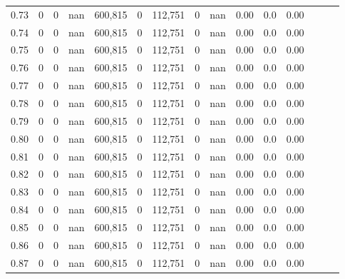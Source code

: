 \begin{tabular}{rrrrrrrrrrrrrrr}
0.73 &        0 &        0 &   nan &  600,815 &        0 &  112,751 &        0 &   nan &  0.00 &                   0.0 &      0.00 \\
0.74 &        0 &        0 &   nan &  600,815 &        0 &  112,751 &        0 &   nan &  0.00 &                   0.0 &      0.00 \\
0.75 &        0 &        0 &   nan &  600,815 &        0 &  112,751 &        0 &   nan &  0.00 &                   0.0 &      0.00 \\
0.76 &        0 &        0 &   nan &  600,815 &        0 &  112,751 &        0 &   nan &  0.00 &                   0.0 &      0.00 \\
0.77 &        0 &        0 &   nan &  600,815 &        0 &  112,751 &        0 &   nan &  0.00 &                   0.0 &      0.00 \\
0.78 &        0 &        0 &   nan &  600,815 &        0 &  112,751 &        0 &   nan &  0.00 &                   0.0 &      0.00 \\
0.79 &        0 &        0 &   nan &  600,815 &        0 &  112,751 &        0 &   nan &  0.00 &                   0.0 &      0.00 \\
0.80 &        0 &        0 &   nan &  600,815 &        0 &  112,751 &        0 &   nan &  0.00 &                   0.0 &      0.00 \\
0.81 &        0 &        0 &   nan &  600,815 &        0 &  112,751 &        0 &   nan &  0.00 &                   0.0 &      0.00 \\
0.82 &        0 &        0 &   nan &  600,815 &        0 &  112,751 &        0 &   nan &  0.00 &                   0.0 &      0.00 \\
0.83 &        0 &        0 &   nan &  600,815 &        0 &  112,751 &        0 &   nan &  0.00 &                   0.0 &      0.00 \\
0.84 &        0 &        0 &   nan &  600,815 &        0 &  112,751 &        0 &   nan &  0.00 &                   0.0 &      0.00 \\
0.85 &        0 &        0 &   nan &  600,815 &        0 &  112,751 &        0 &   nan &  0.00 &                   0.0 &      0.00 \\
0.86 &        0 &        0 &   nan &  600,815 &        0 &  112,751 &        0 &   nan &  0.00 &                   0.0 &      0.00 \\
0.87 &        0 &        0 &   nan &  600,815 &        0 &  112,751 &        0 &   nan &  0.00 &                   0.0 &      0.00 \\

\end{tabular}
